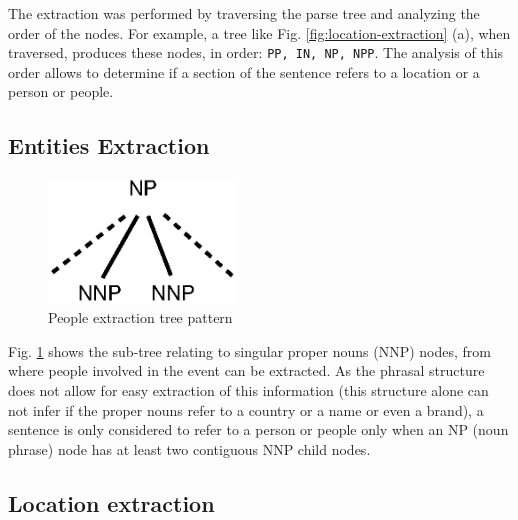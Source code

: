 \documentclass{llncs}
\begin{document}
The extraction was performed by traversing the parse tree and analyzing the order of the nodes. For example, a tree like Fig. \ref{fig:location-extraction} (a), when traversed, produces these nodes, in order: \verb!PP, IN, NP, NPP!. The analysis of this order allows to determine if a section of the sentence refers to a location or a person or people.

\subsection{Entities Extraction}
\label{subsec:approach:entities-extraction}

\begin{figure}[h!]
	\centering
	\includegraphics[width=50mm]{dia/people.eps}
	\caption{People extraction tree pattern}
	\label{fig:people-extraction}
\end{figure}

Fig. \ref{fig:people-extraction} shows the sub-tree relating to singular proper nouns (NNP) nodes, from where people involved in the event can be extracted. As the phrasal structure does not allow for easy extraction of this information (this structure alone can not infer if the proper nouns refer to a country or a name or even a brand), a sentence is only considered to refer to a person or people only when an NP (noun phrase) node has at least two contiguous NNP child nodes.

\newpage
\subsection{Location extraction}
\label{subsec:approach:location-extraction}
\end{document}
